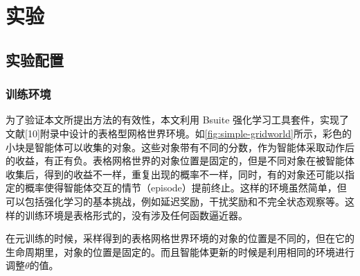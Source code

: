 \chapter{实验}
\label{cha:method}


\section{实验配置}
\subsection{训练环境}
为了验证本文所提出方法的有效性，本文利用 Bsuite \cite{osbandBehaviourSuiteReinforcement2019} 强化学习工具套件，实现了文献[10]附录中设计的表格型网格世界环境。如\autoref{fig:simple-gridworld}所示，彩色的小块是智能体可以收集的对象。这些对象带有不同的分数，作为智能体采取动作后的收益，有正有负。表格网格世界的对象位置是固定的，但是不同对象在被智能体收集后，得到的收益不一样，重复出现的概率不一样，同时，有的对象还可能以指定的概率使得智能体交互的情节（episode）提前终止。这样的环境虽然简单，但可以包括强化学习的基本挑战，例如延迟奖励，干扰奖励和不完全状态观察等。这样的训练环境是表格形式的，没有涉及任何函数逼近器。

在元训练的时候，采样得到的表格网格世界环境的对象的位置是不同的，但在它的生命周期里，对象的位置是固定的。而且智能体更新的时候是利用相同的环境进行调整$\theta$的值。

